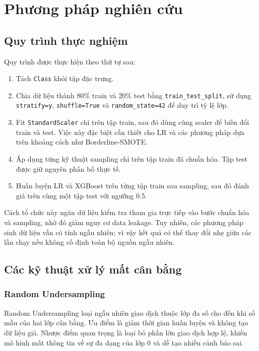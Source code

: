 \documentclass[12pt,a4paper]{article}
\begin{document}
\section{Phương pháp nghiên cứu}

\subsection{Quy trình thực nghiệm}

Quy trình được thực hiện theo thứ tự sau:
\begin{enumerate}
    \item Tách \texttt{Class} khỏi tập đặc trưng.
    \item Chia dữ liệu thành 80\% train và 20\% test bằng \texttt{train\_test\_split}, sử dụng \texttt{stratify=y}, \texttt{shuffle=True} và \texttt{random\_state=42} để duy trì tỷ lệ lớp.
    \item Fit \texttt{StandardScaler} chỉ trên tập train, sau đó dùng cùng scaler để biến đổi train và test. Việc này đặc biệt cần thiết cho LR và các phương pháp dựa trên khoảng cách như Borderline-SMOTE.
    \item Áp dụng từng kỹ thuật sampling chỉ trên tập train đã chuẩn hóa. Tập test được giữ nguyên phân bố thực tế.
    \item Huấn luyện LR và XGBoost trên từng tập train sau sampling, sau đó đánh giá trên cùng một tập test với ngưỡng 0.5.
\end{enumerate}

Cách tổ chức này ngăn dữ liệu kiểm tra tham gia trực tiếp vào bước chuẩn hóa và sampling, nhờ đó giảm nguy cơ data leakage. Tuy nhiên, các phương pháp sinh dữ liệu vẫn có tính ngẫu nhiên; vì vậy kết quả có thể thay đổi nhẹ giữa các lần chạy nếu không cố định toàn bộ nguồn ngẫu nhiên.

\subsection{Các kỹ thuật xử lý mất cân bằng}

\subsubsection{Random Undersampling}

Random Undersampling loại ngẫu nhiên giao dịch thuộc lớp đa số cho đến khi số mẫu của hai lớp cân bằng. Ưu điểm là giảm thời gian huấn luyện và không tạo dữ liệu giả. Nhược điểm quan trọng là loại bỏ phần lớn giao dịch hợp lệ, khiến mô hình mất thông tin về sự đa dạng của lớp 0 và dễ tạo nhiều cảnh báo sai.
\end{document}

